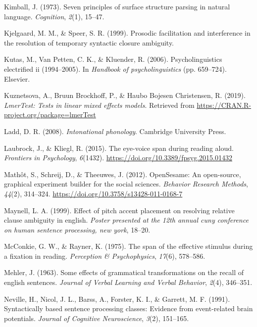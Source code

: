 \documentclass[12pt,oneside]{book}
\begin{document}
\leavevmode\hypertarget{ref-kimball1973seven}{}%
Kimball, J. (1973). Seven principles of surface structure parsing in natural language. \emph{Cognition}, \emph{2}(1), 15--47.

\leavevmode\hypertarget{ref-Kjelgaard1999-xd}{}%
Kjelgaard, M. M., \& Speer, S. R. (1999). Prosodic facilitation and interference in the resolution of temporary syntactic closure ambiguity.

\leavevmode\hypertarget{ref-n400}{}%
Kutas, M., Van Petten, C. K., \& Kluender, R. (2006). Psycholinguistics electrified ii (1994--2005). In \emph{Handbook of psycholinguistics} (pp. 659--724). Elsevier.

\leavevmode\hypertarget{ref-R-lmerTest}{}%
Kuznetsova, A., Bruun Brockhoff, P., \& Haubo Bojesen Christensen, R. (2019). \emph{LmerTest: Tests in linear mixed effects models}. Retrieved from \url{https://CRAN.R-project.org/package=lmerTest}

\leavevmode\hypertarget{ref-ladd}{}%
Ladd, D. R. (2008). \emph{Intonational phonology}. Cambridge University Press.

\leavevmode\hypertarget{ref-evs}{}%
Laubrock, J., \& Kliegl, R. (2015). The eye-voice span during reading aloud. \emph{Frontiers in Psychology}, \emph{6}(1432). \url{https://doi.org/10.3389/fpsyg.2015.01432}

\leavevmode\hypertarget{ref-os2012}{}%
Mathôt, S., Schreij, D., \& Theeuwes, J. (2012). OpenSesame: An open-source, graphical experiment builder for the social sciences. \emph{Behavior Research Methods}, \emph{44}(2), 314--324. \url{https://doi.org/10.3758/s13428-011-0168-7}

\leavevmode\hypertarget{ref-maynell1999effect}{}%
Maynell, L. A. (1999). Effect of pitch accent placement on resolving relative clause ambiguity in english. \emph{Poster presented at the 12th annual cuny conference on human sentence processing, new york}, 18--20.

\leavevmode\hypertarget{ref-spanmcr}{}%
McConkie, G. W., \& Rayner, K. (1975). The span of the effective stimulus during a fixation in reading. \emph{Perception \& Psychophysics}, \emph{17}(6), 578--586.

\leavevmode\hypertarget{ref-mehler1963some}{}%
Mehler, J. (1963). Some effects of grammatical transformations on the recall of english sentences. \emph{Journal of Verbal Learning and Verbal Behavior}, \emph{2}(4), 346--351.

\leavevmode\hypertarget{ref-p600}{}%
Neville, H., Nicol, J. L., Barss, A., Forster, K. I., \& Garrett, M. F. (1991). Syntactically based sentence processing classes: Evidence from event-related brain potentials. \emph{Journal of Cognitive Neuroscience}, \emph{3}(2), 151--165.
\end{document}
